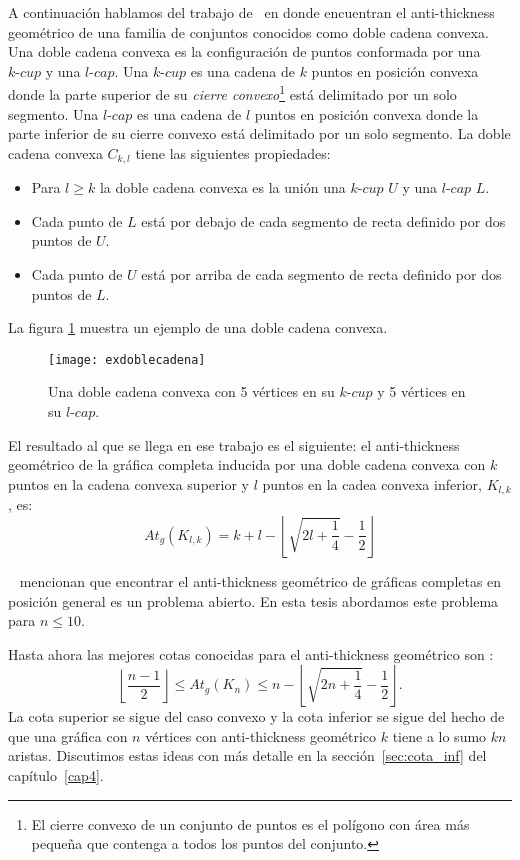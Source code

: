A continuación hablamos del trabajo de~\cite{Lomeli2018} en donde encuentran el
anti-thickness geométrico de una familia de conjuntos conocidos como doble
cadena convexa. Una doble cadena convexa
es la configuración de puntos conformada por una $k\text{-}cup$ y una
$l\text{-}cap$. Una $k\text{-}cup$ es una cadena de $k$ puntos en posición
convexa donde la parte superior de su \emph{cierre convexo}\footnote{El cierre
convexo de un conjunto de puntos es el polígono con área más pequeña que
contenga a todos los puntos del conjunto.} está delimitado por un solo
segmento. Una $l\text{-}cap$ es una cadena de $l$ puntos en posición convexa
donde la parte inferior de su cierre convexo está delimitado por un solo
segmento. La doble cadena convexa $C_{k,l}$ tiene las siguientes propiedades:
\begin{itemize}
  \item Para $l\geq k$ la doble cadena convexa es la unión una $k\text{-}cup$ $U$ y una $l\text{-}cap$ $L$.
  \item Cada punto de $L$ está por debajo de cada segmento de recta definido por dos puntos de $U$.
  \item Cada punto de $U$ está por arriba de cada segmento de recta definido por dos puntos de $L$.
\end{itemize}

La figura \ref{fig:exdoblecadena} muestra un ejemplo de una doble cadena
convexa.
\begin{figure}[htpb]
  \centering
  \texttt{[image: exdoblecadena]}
  \caption{Una doble cadena convexa con 5 vértices en su $k\text{-}cup$ y 5 vértices en su $l\text{-}cap$.}
  \label{fig:exdoblecadena}
\end{figure}

El resultado al que se llega en ese trabajo es el siguiente: el anti-thickness
geométrico de la gráfica completa inducida por una doble cadena convexa con $k$
puntos en la cadena convexa superior y $l$ puntos en la cadea convexa inferior,
$K_{l,k}$, es:
 \[At_g(K_{l,k}) = k+l-\left\lfloor \sqrt{2l+\frac{1}{4}} - \frac{1}{2} \right\rfloor\]

 ~\cite{Dujmovic2017} mencionan que encontrar el anti-thickness geométrico de
 gráficas completas en posición general es un problema abierto. En esta tesis
 abordamos este problema para $n\leq 10$.

 Hasta ahora las mejores cotas conocidas para el anti-thickness geométrico son :
 \[\left\lfloor\frac{n-1}{2}\right\rfloor \leq At_g(K_n) \leq n - \left\lfloor
 \sqrt{2n + \frac{1}{4}} - \frac{1}{2} \right\rfloor. \]
 La cota superior se sigue del caso convexo y la cota inferior
 se sigue del hecho de que una gráfica con $n$ vértices
 con anti-thickness geométrico $k$ tiene a lo sumo $kn$ aristas. Discutimos
 estas ideas con más detalle en la sección~\ref{sec:cota_inf} del capítulo~\ref{cap4}.

